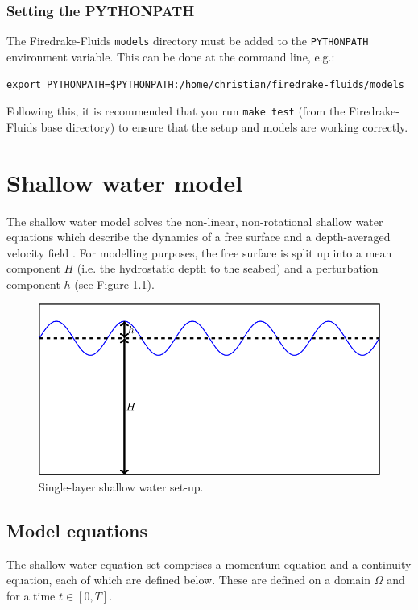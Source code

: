 \documentclass[a4paper,11pt]{report}
\begin{document}
\subsection{Setting the PYTHONPATH}
The Firedrake-Fluids \texttt{models} directory must be added to the \texttt{PYTHONPATH} environment variable. This can be done at the command line, e.g.:

\texttt{export PYTHONPATH=\$PYTHONPATH:/home/christian/firedrake-fluids/models}

Following this, it is recommended that you run \texttt{make test} (from the Firedrake-Fluids base directory) to ensure that the setup and models are working correctly.

\chapter{Shallow water model}
The shallow water model solves the non-linear, non-rotational shallow water equations which describe the dynamics of a free surface and a depth-averaged velocity field \citep{Zhou_2004}. For modelling purposes, the free surface is split up into a mean component $H$ (i.e. the hydrostatic depth to the seabed) and a perturbation component $h$ (see Figure \ref{fig:shallow_water_setup}).

\begin{figure}
   \centering
   \includegraphics[width=0.6\columnwidth]{images/shallow_water_h_H.png}
   \caption{Single-layer shallow water set-up.}
   \label{fig:shallow_water_setup}
\end{figure}

\section{Model equations}\label{sect:model_equations}
The shallow water equation set comprises a momentum equation and a continuity equation, each of which are defined below. These are defined on a domain $\Omega$ and for a time $t \in [0, T]$.
\end{document}
